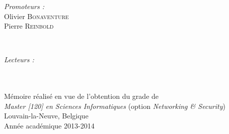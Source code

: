 \documentclass[a4paper,12pt,french]{report}
\begin{document}
\begin{titlepage}
\begin{minipage}{0.4\textwidth}
\begin{flushleft} \large
\emph{Promoteurs :} \\
Olivier \textsc{Bonaventure}\\
Pierre \textsc{Reinbold}
\end{flushleft}
\end{minipage}
~
\begin{minipage}{0.4\textwidth}
\begin{flushright} \large
\emph{Lecteurs :} \\
 \textsc{}\\
 \textsc{}
\end{flushright}
\end{minipage}\\[2cm]


{\normalsize Mémoire réalisé en vue de l'obtention du grade de\\
\emph{Master [120] en Sciences Informatiques} (option \emph{Networking \& Security})}\\[1.5cm]

{\normalsize Louvain-la-Neuve, Belgique}\\
{\normalsize Année académique 2013-2014}

\end{titlepage}

\tableofcontents
\thispagestyle{empty}












\end{document}
